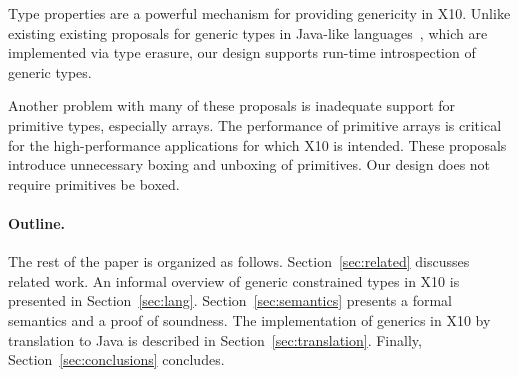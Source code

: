 Type properties are a powerful mechanism
for providing genericity in X10.
Unlike existing 
existing proposals for generic types in
Java-like
languages~\cite{Java3,GJ,Pizza,polyj,thorup97,scala},
which 
are implemented via type erasure,
our design supports run-time introspection of generic types.

Another problem with many of these proposals is inadequate support
for primitive types, especially arrays. The performance of primitive arrays is
critical for the high-performance applications for which
X10 is intended. These proposals introduce unnecessary boxing
and unboxing of primitives.
Our design does not require primitives be boxed.

\paragraph{Outline.}
The rest of the paper is organized as follows.
%
Section~\ref{sec:related} discusses related work.
%
An informal overview of generic constrained types in X10
is presented in
Section~\ref{sec:lang}.  
%
Section~\ref{sec:semantics} presents a formal semantics and a
proof of soundness.
%
The implementation of generics in X10 by translation to Java is described in 
Section~\ref{sec:translation}.
%
Finally, Section~\ref{sec:conclusions} concludes.

